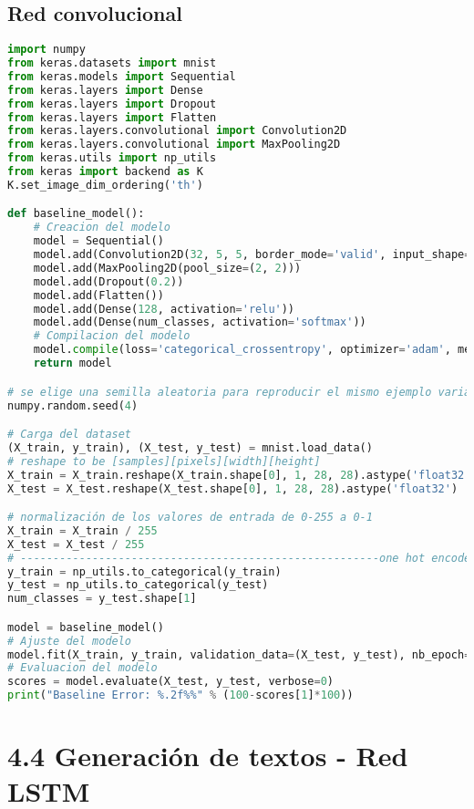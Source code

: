 \subsection{Red convolucional}
\begin{lstlisting}[language=Python]
import numpy
from keras.datasets import mnist
from keras.models import Sequential
from keras.layers import Dense
from keras.layers import Dropout
from keras.layers import Flatten
from keras.layers.convolutional import Convolution2D
from keras.layers.convolutional import MaxPooling2D
from keras.utils import np_utils
from keras import backend as K
K.set_image_dim_ordering('th')

def baseline_model():
	# Creacion del modelo
	model = Sequential()
	model.add(Convolution2D(32, 5, 5, border_mode='valid', input_shape=(1, 28, 28), activation='relu'))
	model.add(MaxPooling2D(pool_size=(2, 2)))
	model.add(Dropout(0.2))
	model.add(Flatten())
	model.add(Dense(128, activation='relu'))
	model.add(Dense(num_classes, activation='softmax'))
	# Compilacion del modelo
	model.compile(loss='categorical_crossentropy', optimizer='adam', metrics=['accuracy'])
	return model

# se elige una semilla aleatoria para reproducir el mismo ejemplo varias veces
numpy.random.seed(4)

# Carga del dataset
(X_train, y_train), (X_test, y_test) = mnist.load_data()
# reshape to be [samples][pixels][width][height]
X_train = X_train.reshape(X_train.shape[0], 1, 28, 28).astype('float32')
X_test = X_test.reshape(X_test.shape[0], 1, 28, 28).astype('float32')

# normalización de los valores de entrada de 0-255 a 0-1
X_train = X_train / 255
X_test = X_test / 255
# -------------------------------------------------------one hot encode outputs
y_train = np_utils.to_categorical(y_train)
y_test = np_utils.to_categorical(y_test)
num_classes = y_test.shape[1]

model = baseline_model()
# Ajuste del modelo
model.fit(X_train, y_train, validation_data=(X_test, y_test), nb_epoch=10, batch_size=200, verbose=2)
# Evaluacion del modelo
scores = model.evaluate(X_test, y_test, verbose=0)
print("Baseline Error: %.2f%%" % (100-scores[1]*100))
\end{lstlisting}

\section{4.4 Generación de textos - Red LSTM}
